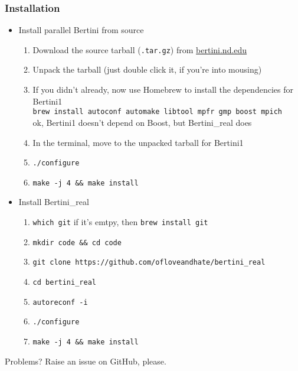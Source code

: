 \subsubsection{Installation}
\begin{itemize}
  \item Install parallel Bertini from source
   \begin{enumerate}
    \item Download the source tarball ({\tt .tar.gz}) from \href{http://bertini.nd.edu}{bertini.nd.edu}
    \item Unpack the tarball (just double click it, if you're into mousing)
    \item If you didn't already, now use Homebrew to install the dependencies for Bertini1 \\{\tt brew install autoconf automake libtool mpfr gmp boost mpich}\\ ok, Bertini1 doesn't depend on Boost, but Bertini\_real does
    \item In the terminal, move to the unpacked tarball for Bertini1
    \item {\tt ./configure}
    \item {\tt make -j 4 \&\& make install}
  \end{enumerate}
  \item Install Bertini\_real  
   \begin{enumerate}
    \item {\tt which git}  if it's emtpy, then {\tt brew install git}
    \item {\tt mkdir code \&\& cd code}
    \item {\tt git clone https://github.com/ofloveandhate/bertini\_real}
    \item {\tt cd bertini\_real}
    \item {\tt autoreconf -i}
    \item {\tt ./configure}
    \item {\tt make -j 4 \&\& make install} 
   \end{enumerate} 
\end{itemize} 


Problems?  Raise an issue on GitHub, please. 